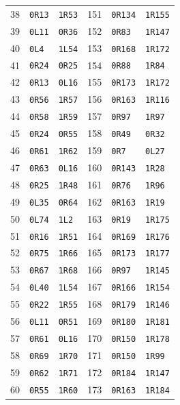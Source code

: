 \begin{longtable}{@{}rll@{\qquad\qquad}rll@{}}
38 & \texttt{0R13} & \texttt{1R53} & 151 & \texttt{0R134} & \texttt{1R155}\\
39 & \texttt{0L11} & \texttt{0R36} & 152 & \texttt{0R83} & \texttt{1R147}\\
40 & \texttt{0L4} & \texttt{1L54} & 153 & \texttt{0R168} & \texttt{1R172}\\
41 & \texttt{0R24} & \texttt{0R25} & 154 & \texttt{0R88} & \texttt{1R84}\\
42 & \texttt{0R13} & \texttt{0L16} & 155 & \texttt{0R173} & \texttt{1R172}\\
43 & \texttt{0R56} & \texttt{1R57} & 156 & \texttt{0R163} & \texttt{1R116}\\
44 & \texttt{0R58} & \texttt{1R59} & 157 & \texttt{0R97} & \texttt{1R97}\\
45 & \texttt{0R24} & \texttt{0R55} & 158 & \texttt{0R49} & \texttt{0R32}\\
46 & \texttt{0R61} & \texttt{1R62} & 159 & \texttt{0R7} & \texttt{0L27}\\
47 & \texttt{0R63} & \texttt{0L16} & 160 & \texttt{0R143} & \texttt{1R28}\\
48 & \texttt{0R25} & \texttt{1R48} & 161 & \texttt{0R76} & \texttt{1R96}\\
49 & \texttt{0L35} & \texttt{0R64} & 162 & \texttt{0R163} & \texttt{1R19}\\
50 & \texttt{0L74} & \texttt{1L2} & 163 & \texttt{0R19} & \texttt{1R175}\\
51 & \texttt{0R16} & \texttt{1R51} & 164 & \texttt{0R169} & \texttt{1R176}\\
52 & \texttt{0R75} & \texttt{1R66} & 165 & \texttt{0R173} & \texttt{1R177}\\
53 & \texttt{0R67} & \texttt{1R68} & 166 & \texttt{0R97} & \texttt{1R145}\\
54 & \texttt{0L40} & \texttt{1L54} & 167 & \texttt{0R166} & \texttt{1R154}\\
55 & \texttt{0R22} & \texttt{1R55} & 168 & \texttt{0R179} & \texttt{1R146}\\
56 & \texttt{0L11} & \texttt{0R51} & 169 & \texttt{0R180} & \texttt{1R181}\\
57 & \texttt{0R61} & \texttt{0L16} & 170 & \texttt{0R150} & \texttt{1R178}\\
58 & \texttt{0R69} & \texttt{1R70} & 171 & \texttt{0R150} & \texttt{1R99}\\
59 & \texttt{0R62} & \texttt{1R71} & 172 & \texttt{0R184} & \texttt{1R147}\\
60 & \texttt{0R55} & \texttt{1R60} & 173 & \texttt{0R163} & \texttt{1R184}\\

\end{longtable}
